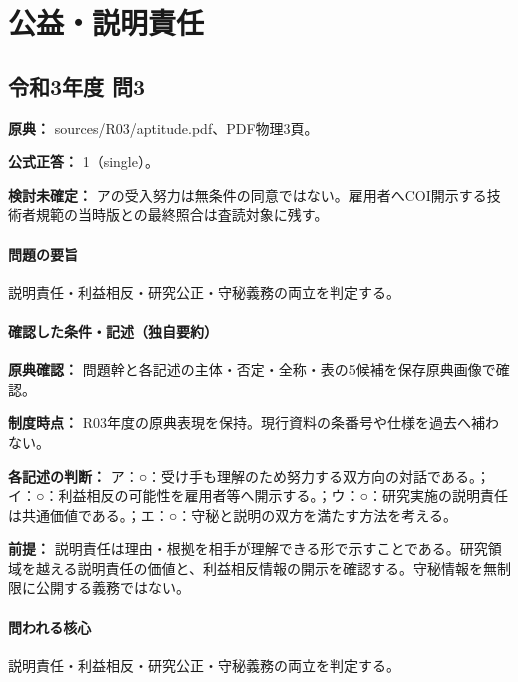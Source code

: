 \section{公益・説明責任}

\subsection{令和3年度 問3}
\label{q:r03-reg-apt-03}

\noindent\textbf{原典：} sources/R03/aptitude.pdf、PDF物理3頁。

\textbf{公式正答：} 1（single）。

\par\textbf{検討未確定：} アの受入努力は無条件の同意ではない。雇用者へCOI開示する技術者規範の当時版との最終照合は査読対象に残す。

\paragraph{問題の要旨} 説明責任・利益相反・研究公正・守秘義務の両立を判定する。

\paragraph{確認した条件・記述（独自要約）}\mbox{}\par

\noindent\textbf{原典確認：} 問題幹と各記述の主体・否定・全称・表の5候補を保存原典画像で確認。\par

\noindent\textbf{制度時点：} R03年度の原典表現を保持。現行資料の条番号や仕様を過去へ補わない。\par

\noindent\textbf{各記述の判断：} ア：○：受け手も理解のため努力する双方向の対話である。；イ：○：利益相反の可能性を雇用者等へ開示する。；ウ：○：研究実施の説明責任は共通価値である。；エ：○：守秘と説明の双方を満たす方法を考える。\par

\noindent\textbf{前提：} 説明責任は理由・根拠を相手が理解できる形で示すことである。研究領域を越える説明責任の価値と、利益相反情報の開示を確認する。守秘情報を無制限に公開する義務ではない。\par

\paragraph{問われる核心} 説明責任・利益相反・研究公正・守秘義務の両立を判定する。

